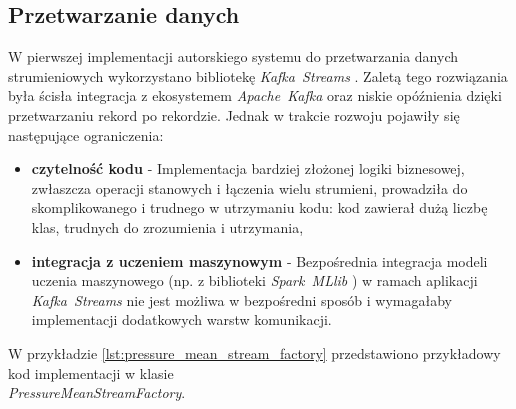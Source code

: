 \subsection{Przetwarzanie danych}

W pierwszej implementacji autorskiego systemu do przetwarzania danych strumieniowych wykorzystano bibliotekę \mbox{\textit{Kafka Streams}} \cite{kafka_streams}. Zaletą tego rozwiązania była ścisła integracja z ekosystemem \mbox{\textit{Apache Kafka}} \cite{kafka} oraz niskie opóźnienia dzięki przetwarzaniu rekord po rekordzie. Jednak w trakcie rozwoju pojawiły się następujące ograniczenia:

\vspace{0.3em}

\begin{itemize}
    \item \textbf{czytelność kodu} - Implementacja bardziej złożonej logiki biznesowej, zwłaszcza operacji stanowych i łączenia wielu strumieni, prowadziła do skomplikowanego i trudnego w utrzymaniu kodu: kod zawierał dużą liczbę klas, trudnych do zrozumienia i utrzymania,
    \item \textbf{integracja z uczeniem maszynowym} - Bezpośrednia integracja modeli uczenia maszynowego (np. z biblioteki \mbox{\textit{Spark MLlib}} \cite{spark_mllib_reference}) w ramach aplikacji \mbox{\textit{Kafka Streams}} nie jest możliwa w bezpośredni sposób i wymagałaby implementacji dodatkowych warstw komunikacji.
\end{itemize}

\vspace{0.3em}

W przykładzie \ref{lst:pressure_mean_stream_factory} przedstawiono przykładowy kod implementacji w klasie \\ \mbox{\textit{PressureMeanStreamFactory}}.

\newpage

